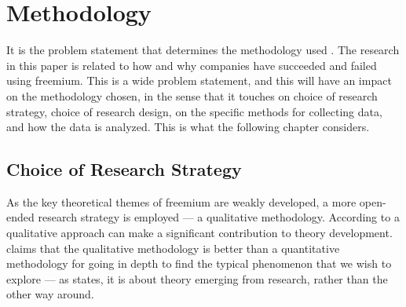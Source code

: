 \chapter{Methodology}
\label{chapter:methodology}

It is the problem statement that determines the methodology used \citep{berg2007}. The research in this paper is related to how and why companies have succeeded and failed using freemium. This is a wide problem statement, and this will have an impact on the methodology chosen, in the sense that it touches on choice of research strategy, choice of research design, on the specific methods for collecting data, and how the data is analyzed. This is what the following chapter considers.


\section{Choice of Research Strategy}

As the key theoretical themes of freemium are weakly developed, a more open-ended research strategy is employed --- a qualitative methodology. According to \citet{eisenhardt1989} a qualitative approach can make a significant contribution to theory development. \citet{berg2007} claims that the qualitative methodology is better than a quantitative methodology for going in depth to find the typical phenomenon that we wish to explore --- as \citet{bryman2008} states, it is about theory emerging from research, rather than the other way around.

